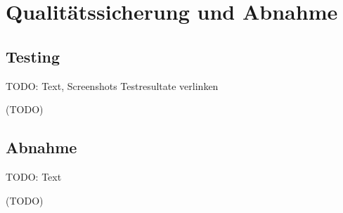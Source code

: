 \section{Qualitätssicherung und Abnahme} 
\label{sec:QualitätssicherungAbnahme}

\subsection{Testing}
\label{subsec:Testing}

TODO: Text, Screenshots Testresultate verlinken

(TODO)

\subsection{Abnahme}
\label{subsec:Abnahme}

TODO: Text

(TODO)

